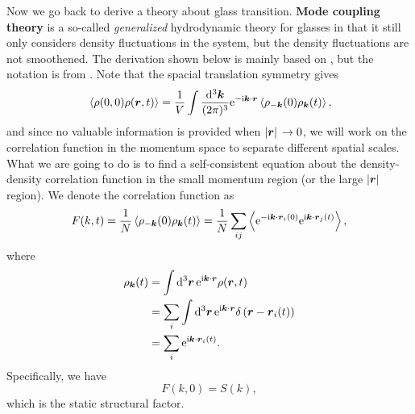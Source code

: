 \documentclass[hyperref, a4paper]{article}
\newcommand*{\ii}{\mathrm{i}}
\newcommand*{\ee}{\mathrm{e}}
\newcommand*{\concept}[1]{{\textbf{#1}}}
\begin{document}
Now we go back to derive a theory about glass transition. \concept{Mode coupling theory} is a so-called \emph{generalized}
hydrodynamic theory for glasses \cite{RevModPhys.76.785} in that it still only considers density fluctuations in the system,
but the density fluctuations are not smoothened. The derivation shown below is mainly based on \cite{mct2005}, 
but the notation is from \cite{RevModPhys.76.785}. Note that the spacial translation symmetry gives 
\begin{equation}
    \expval*{\rho(0, 0) \rho(\vb*{r}, t)} = \frac{1}{V} \int \frac{\dd[3]{\vb*{k}}}{(2\pi)^3} 
    \ee^{- \ii \vb*{k} \cdot \vb*{r}} \expval*{\rho_{-\vb*{k}}(0) \rho_{\vb*{k}}(t)},
\end{equation}
and since no valuable information is provided when $\abs*{\vb*{r}} \to 0$, we will work on the correlation function
in the momentum space to separate different spatial scales.
What we are going to do is to find a self-consistent equation about the density-density correlation function in 
the small momentum region (or the large $\abs*{\vb*{r}}$ region). We denote the correlation function as 
\begin{equation}
    F(k, t)=\frac{1}{N}\left\langle\rho_{-\vb*{k}}(0) \rho_{\vb*{k}}(t)\right\rangle=\frac{1}{N} \sum_{i j}\left\langle \ee^{-\ii \vb*{k} \cdot \vb*{r}_{i}(0)} \ee^{\ii \vb*{k} \cdot \vb*{r}_{j}(t)}\right\rangle,
\end{equation}
where 
\begin{equation}
    \begin{aligned}
        \rho_{\vb*{k}}(t) &= \int \dd[3]{\vb*{r}} \ee^{\ii \vb*{k} \cdot \vb*{r}} \rho(\vb*{r}, t) \\
        &=\sum_{i} \int \dd[3]{\vb*{r}} \ee^{\ii \vb*{k} \cdot \vb*{r}} \delta\left(\vb*{r}-\vb*{r}_{i}(t)\right) \\
        &=\sum_{i} \ee^{\ii \vb*{k} \cdot \vb*{r}_{i}(t)}.
    \end{aligned}
\end{equation}
Specifically, we have 
\begin{equation}
    F(k, 0) = S(k),
\end{equation}
which is the static structural factor.
\end{document}
